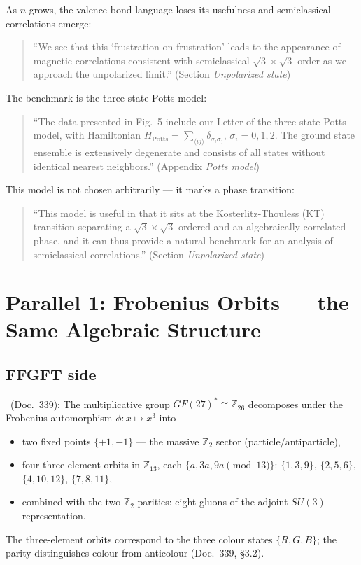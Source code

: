 As $n$ grows, the valence-bond language loses its usefulness and
semiclassical correlations emerge:
\begin{quote}\QM
``We see that this `frustration on frustration' leads to the appearance of
magnetic correlations consistent with semiclassical $\sqrt{3}\times\sqrt{3}$
order as we approach the unpolarized limit.''
(Section \emph{Unpolarized state})
\end{quote}
The benchmark is the three-state Potts model:
\begin{quote}\QM
``The data presented in Fig.~5 include our Letter of the three-state Potts
model, with Hamiltonian $H_\text{Potts}=\sum_{\langle ij\rangle}
\delta_{\sigma_i\sigma_j}$, $\sigma_i=0,1,2$. The ground state ensemble is
extensively degenerate and consists of all states without identical nearest
neighbors.'' (Appendix \emph{Potts model})
\end{quote}
This model is not chosen arbitrarily --- it marks a phase transition:
\begin{quote}\QM
``This model is useful in that it sits at the Kosterlitz-Thouless (KT)
transition separating a $\sqrt{3}\times\sqrt{3}$ ordered and an
algebraically correlated phase, and it can thus provide a natural benchmark
for an analysis of semiclassical correlations.''
(Section \emph{Unpolarized state})
\end{quote}

\section{Parallel 1: Frobenius Orbits --- the Same Algebraic Structure}

\subsection{FFGFT side}

\BM\ (Doc.~339): The multiplicative group $GF(27)^*\cong\mathbb{Z}_{26}$
decomposes under the Frobenius automorphism $\phi: x\mapsto x^3$ into
\begin{itemize}
  \item two fixed points $\{+1,-1\}$ --- the massive $\mathbb{Z}_2$ sector
        (particle/antiparticle),
  \item four three-element orbits in $\mathbb{Z}_{13}$, each
        $\{a,3a,9a\pmod{13}\}$: $\{1,3,9\}$, $\{2,5,6\}$, $\{4,10,12\}$,
        $\{7,8,11\}$,
  \item combined with the two $\mathbb{Z}_2$ parities: eight gluons of the
        adjoint $SU(3)$ representation.
\end{itemize}
The three-element orbits correspond to the three colour states $\{R,G,B\}$;
the parity distinguishes colour from anticolour (Doc.~339, §3.2).

